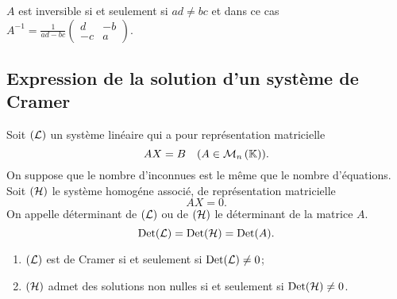 $A$ est inversible si et seulement si $ad \neq bc$ et dans ce cas $A^{-1} = \frac{1}{ad-bc} \begin{pmatrix} d & -b \\ -c & a \end{pmatrix}$.

\subsection{Expression de la solution d'un système de Cramer}

Soit $(\mathcal{L})$ un système linéaire qui a pour représentation matricielle
\begin{equation}
  AX=B \quad (A \in \mathcal{M}_{n}\left(\mathbb{K}\right)).
\end{equation}
On suppose que le nombre d'inconnues est le même que le nombre d'équations. Soit $(\mathcal{H})$ le système homogéne associé, de représentation matricielle
\begin{equation}
  AX=0.
\end{equation}
On appelle déterminant de $(\mathcal{L})$ ou de $(\mathcal{H})$ le déterminant de la matrice $A$.
\begin{equation}
  \operatorname{Det}(\mathcal{L})=\operatorname{Det}(\mathcal{H})=\operatorname{Det}(A).
\end{equation}

\begin{prop}
  \begin{enumerate}
  \item $(\mathcal{L})$ est de Cramer si et seulement si $\operatorname{Det}(\mathcal{L}) \neq 0$;
  \item $(\mathcal{H})$ admet des solutions non nulles si et seulement si $\operatorname{Det}(\mathcal{H}) \neq 0$.
  \end{enumerate}
\end{prop}

